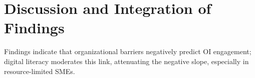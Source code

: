\chapter{Discussion and Integration of Findings}
Findings indicate that organizational barriers negatively predict OI engagement; digital literacy moderates this link, attenuating the negative slope, especially in resource-limited SMEs.
